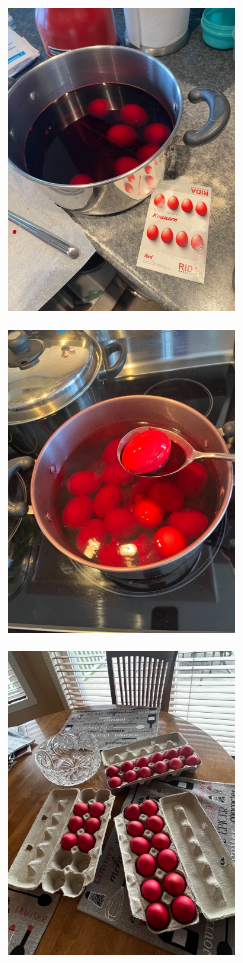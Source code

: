 \begin{figure}
  \includegraphics[width=60mm]{monanteras/images/Eggs 3.jpg}
\end{figure}
\begin{figure}
  \includegraphics[width=60mm]{monanteras/images/Eggs 5.jpg}
\end{figure}
\begin{figure}
  \includegraphics[width=60mm]{monanteras/images/Eggs 4.jpg}
\end{figure}

